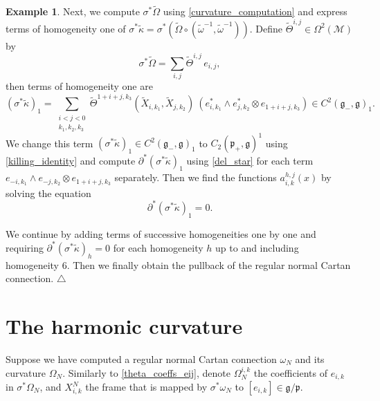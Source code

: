 \documentclass{amsart}
\theoremstyle{plain}
\theoremstyle{definition}
\newtheorem*{example}{Example}
\theoremstyle{remark}
\newcommand{\mc}[1]{\mathcal{#1}}
\newcommand{\mfk}[1]{\mathfrak{#1}}
\begin{document}
\begin{example}
    Next, we compute $\sigma^*\widetilde\Omega$ using \eqref{curvature_computation} and express terms of homogeneity one of $\sigma^*\widetilde\kappa = \sigma^* \left(\widetilde\Omega \circ (\widetilde\omega^{-1},\widetilde\omega^{-1})\right)$. Define $\widetilde\Theta^{i,j} \in \Omega^2(\mc{M})$ by
    \begin{equation}\label{theta_coeffs_eij}
        \sigma^*\widetilde\Omega = \sum_{i,j} \widetilde\Theta^{i,j}\, e_{i,j},
    \end{equation}
    then terms of homogeneity one are
    \begin{equation*}
        (\sigma^*\widetilde\kappa)_1 = \sum_{\substack{i < j < 0\\ k_1, k_2, k_3}} \widetilde\Theta^{1+i+j,k_3}(\widetilde{X}_{i,k_1}, \widetilde{X}_{j,k_2})\ \left( e_{i,k_1}^* \wedge e_{j,k_2}^* \otimes e_{1+i+j,k_3} \right) \in C^2(\mfk{g}_-,\mfk{g})_1.
    \end{equation*}
    We change this term $(\sigma^*\widetilde\kappa)_1 \in C^2(\mfk{g}_-,\mfk{g})_1$ to $C_2(\mfk{p}_+,\mfk{g})^1$ using \eqref{killing_identity} and compute $\partial^* (\sigma^*\widetilde\kappa)_1$ using \eqref{del_star} for each term $e_{-i,k_1} \wedge e_{-j,k_2} \otimes e_{1+i+j,k_3}$ separately. Then we find the functions $a_{i,k}^{h,j} (x)$ by solving the equation
    \begin{equation*}
        \partial^* (\sigma^*\widetilde\kappa)_1 = 0.
    \end{equation*}

    We continue by adding terms of successive homogeneities one by one and requiring $\partial^* (\sigma^*\widetilde\kappa)_h = 0$ for each homogeneity $h$ up to and including homogeneity $6$. Then we finally obtain the pullback of the regular normal Cartan connection.
    \hfill$\triangle$
\end{example}

\section{The harmonic curvature} \label{section:harmonic_curvature}

Suppose we have computed a regular normal Cartan connection $\omega_N$ and its curvature $\Omega_N$. Similarly to \eqref{theta_coeffs_eij}, denote $\Omega_N^{i,k}$ the coefficients of $e_{i,k}$ in $\sigma^*\Omega_N$, and $X^N_{i,k}$ the frame that is mapped by $\sigma^*\omega_N$ to $[e_{i,k}] \in \mfk{g}/\mfk{p}$.
\end{document}
